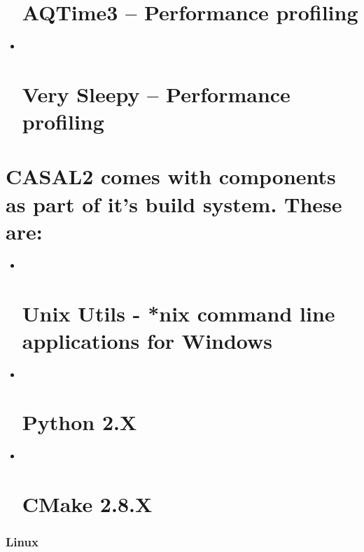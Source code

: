 \documentclass[a4paper,11pt,twoside,pdftex,draft]{article}
\begin{document}
\begin{itemize}
{  \section{AQTime3 -- Performance
  profiling}\label{aqtime3-performance-profiling}}
\item ~
  \hypertarget{very-sleepy-performance-profiling}{%
  \section{Very Sleepy -- Performance
  profiling}\label{very-sleepy-performance-profiling}}
\end{itemize}

\hypertarget{section-1}{%
\section{}\label{section-1}}

\hypertarget{casal2-comes-with-components-as-part-of-its-build-system.-these-are}{%
\section{CASAL2 comes with components as part of it's build system.
These
are:}\label{casal2-comes-with-components-as-part-of-its-build-system.-these-are}}

\begin{itemize}
\item ~
  \hypertarget{unix-utils---nix-command-line-applications-for-windows}{%
  \section{Unix Utils - *nix command line applications for
  Windows}\label{unix-utils---nix-command-line-applications-for-windows}}
\item ~
  \hypertarget{python-2.x}{%
  \section{\texorpdfstring{Python 2.X }{Python 2.X }}\label{python-2.x}}
\item ~
  \hypertarget{cmake-2.8.x}{%
  \section{CMake 2.8.X}\label{cmake-2.8.x}}
\end{itemize}

\hypertarget{linux}{%
\subsubsection[Linux]{\texorpdfstring{\protect\hypertarget{anchor-9}{}{}Linux}{Linux}}\label{linux}}
\end{document}

